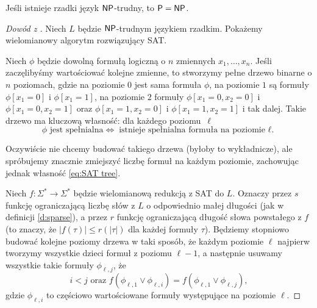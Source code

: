 \begin{theorem}[Mahaneya]\label{t:Mahaney}
    Jeśli istnieje rzadki język $\textsf{NP}$-trudny, to $\textsf{P} = \textsf{NP}$.
\end{theorem}
\begin{proof}[Dowód z \cite{Grochow}]
    Niech $L$ będzie $\textsf{NP}$-trudnym językiem rzadkim. Pokażemy wielomianowy algorytm rozwiązujący SAT.

    Niech $\phi$ będzie dowolną formułą logiczną o $n$ zmiennych $x_1, \ldots, x_n$. Jeśli zaczęlibyśmy wartościować kolejne zmienne, to stworzymy pełne drzewo binarne o $n$ poziomach, gdzie na poziomie $0$ jest sama formuła $\phi$, na poziomie $1$ są formuły $\phi[x_1 \!=\! 0]$ i $\phi[x_1 \!=\! 1]$, na poziomie $2$ formuły $\phi[x_1 \!=\! 0, x_2 \!=\! 0]$ i $\phi[x_1 \!=\! 0, x_2 \!=\! 1]$ oraz $\phi[x_1 \!=\! 1, x_2 \!=\! 0]$ i $\phi[x_1 \!=\! 1, x_2 \!=\! 1]$ i tak dalej. Takie drzewo ma kluczową własność: dla każdego poziomu~$\ell$
    \begin{equation}\label{eq:SAT tree}
        \phi \text{ jest spełnialna} \iff \text{istnieje spełnialna formuła na poziomie $\ell$.}
    \end{equation}

    Oczywiście nie chcemy budować takiego drzewa (byłoby to wykładnicze), ale spróbujemy znacznie zmiejszyć liczbę formuł na każdym poziomie, zachowując jednak własność \ref{eq:SAT tree}.

    Niech $f : \Sigma^* \to \Sigma^*$ będzie wielomianową redukcją z SAT do $L$. Oznaczy przez $s$ funkcję ograniczającą liczbę słów z $L$ o odpowiednio małej długości (jak w definicji \ref{d:sparse}), a przez $r$ funkcję ograniczającą długość słowa powstałego z $f$ (to znaczy, że $|f(\tau)| \leq r(|\tau|)$ dla każdej formuły $\tau$).
    Będziemy stopniowo budować kolejne poziomy drzewa w taki sposób, że każdym poziomie $\ell$ najpierw tworzymy wszystkie dzieci formuł z poziomu $\ell - 1$, a następnie usuwamy wszystkie takie formuły $\phi_{\ell, j}$, że
    \[ i < j \text{ oraz } f(\phi_{\ell, 1} \lor \phi_{\ell, i}) = f(\phi_{\ell, 1} \lor \phi_{\ell, j}), \]
    gdzie $\phi_{\ell, i}$ to częściowo wartościowane formuły występujące na poziomie $\ell$.


\end{proof}
